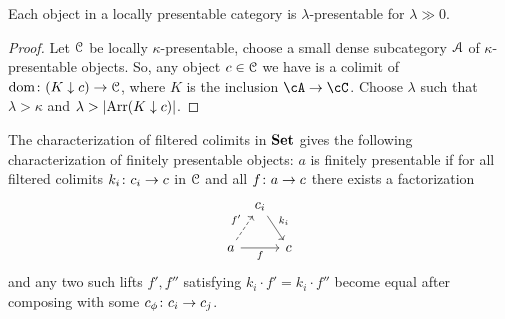\documentclass[a4paper,11pt,oneside,openany]{scrbook}
\begin{document}
\begin{prop}
	Each object in a locally presentable category is $ \lambda $-presentable
	for $ \lambda \gg 0 $.
\end{prop}
\begin{proof}
	Let $ \operatorname{\mathcal{C}} $ be locally $\kappa $-presentable, choose a small dense subcategory $\operatorname{\mathcal{A}} $ of $ \kappa $-presentable objects.
	So, any object $ c \in \operatorname{\mathcal{C}} $ we have is a colimit of $\operatorname{dom}\colon (K\downarrow
    c)\rightarrow\operatorname{\mathcal{C}}$, where $K$ is the inclusion $\cA\rightarrow\cC$.
	Choose $ \lambda $ such that $ \lambda > \kappa $ and $ \lambda >
    \left\lvert \operatorname{Arr}(K\downarrow c) \right\rvert $.
\end{proof}
The characterization of filtered colimits in $ {\normalfont\textbf{Set}} $ gives the following
characterization of finitely presentable objects: $ a $ is finitely presentable
if for all filtered colimits $ k_i \colon c_i \to c $ in $ \operatorname{\mathcal{C}} $ and all $ f\colon
a \to c $ there exists a factorization
\begin{displaymath}
	\begin{tikzcd}[column sep=tiny]
		& c_i \arrow[dr, "k_i"]&\\
		a \arrow[ur, dashed, "f'"]\arrow[rr, "f"']&& c
	\end{tikzcd}
\end{displaymath}
and any two such lifts $f',f''$ satisfying $k_i\cdot f'=k_i\cdot f''$ become equal
after composing with some $c_\phi\colon c_i\to c_j$.
\end{document}
